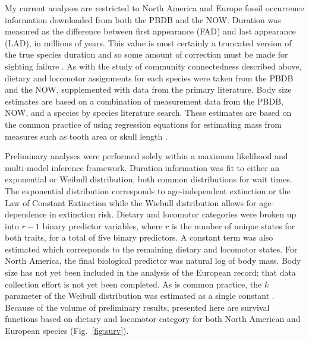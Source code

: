 \documentclass[11pt,letterpaper]{article}
\begin{document}
My current analyses are restricted to North America and Europe fossil occurrence information downloaded from both the PBDB and the NOW. Duration was measured as the difference between first appearance (FAD) and last appearance (LAD), in millions of years. This value is most certainly a truncated version of the true species duration and so some amount of correction must be made for sighting failure \citep{Alroy2014a,Solow1997,Strauss1989}. As with the study of community connectedness described above, dietary and locomotor assignments for each species were taken from the PBDB and the NOW, supplemented with data from the primary literature. Body size estimates are based on a combination of measurement data from the PBDB, NOW, and a species by species literature search. These estimates are based on the common practice of using regression equations for estimating mass from measures such as tooth area or skull length \citep{Alroy1998,Tomiya2013,Jernvall2004,Alroy2009,Slater2013a}. 

Preliminary analyses were performed solely within a maximum likelihood and multi-model inference framework. Duration information was fit to either an exponential or Weibull distribution, both common distributions for wait times. The exponential distribution corresponds to age-independent extinction or the Law of Constant Extinction \citep{VanValen1973} while the Wiebull distribution allows for age-dependence in extinction risk. Dietary and locomotor categories were broken up into \(r - 1\) binary predictor variables, where \(r\) is the number of unique states for both traits, for a total of five binary predictors. A constant term was also estimated which corresponds to the remaining dietary and locomotor states. For North America, the final biological predictor was natural log of body mass. Body size has not yet been included in the analysis of the European record; that data collection effort is not yet been completed. As is common practice, the \(k\) parameter of the Weibull distribution was estimated as a single constant \citep{Kleinbaum2005}. Because of the volume of preliminary results, presented here are survival functions based on dietary and locomotor category for both North American and European species (Fig.~\ref{fig:surv}).
 
\end{document}
